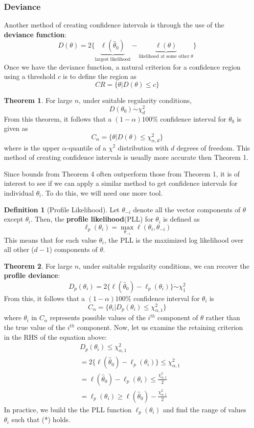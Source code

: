\documentclass{article}
\theoremstyle{definition}
\newtheorem{theorem}{Theorem}
\theoremstyle{definition}
\newtheorem{definition}{Definition}
\def\l{\ell}
\newcommand{\dotrel}[1]{\mathrel{\dot{#1}}}
\begin{document}
\subsubsection{Deviance}
Another method of creating confidence intervals is through the use of the \textbf{deviance function}:
\[D(\theta)= 2\{ \underbrace{\l(\hat{\theta}_0)}_{\text{largest likelihood}} - \underbrace{\l(\theta)}_{\text{likelihood at some other $\theta$}}\}\]
Once we have the deviance function, a natural criterion for a confidence region using a threshold $c$ is to define the region as
\[CR=\{\theta| D(\theta)\leq c\}\]

\begin{theorem}For large $n$, under suitable regularity conditions, 
\[D(\theta_0)\dotrel{\sim} \chi^2_d\]
From this theorem, it follows that a $(1-\alpha)100\%$ confidence interval for $\theta_0$ is given as 
\[C_\alpha= \{\theta| D(\theta)\leq \chi_{\alpha,d}^2\}\]
where is the upper $\alpha$-quantile of a $\chi^2$ distribution with $d$ degrees of freedom. This method of creating confidence intervals is usually more accurate then Theorem 1.
\end{theorem}
Since bounds from Theorem 4 often outperform those from Theorem 1, it is of interest to see if we can apply a similar method to get confidence intervals for individual $\theta_i$. To do this, we will need one more tool.
\begin{definition}[Profile Likelihood]
Let $\theta_{-i}$ denote all the vector components of $\theta$ except $\theta_i$. Then, the \textbf{profile likelihood}(PLL) for $\theta_i$ is defined as 
\[\l_p(\theta_i)= \max_{\theta_{-i}}\l(\theta_i, \theta_{-i})\]
This means that for each value $\theta_i$, the PLL is the maximized log likelihood over all other ($d-1$) components of $\theta$.
\end{definition}

\begin{theorem}For large $n$, under suitable regularity conditions, we can recover the \textbf{profile deviance}:
\[D_p(\theta_i)= 2 \{ \l(\hat{\theta}_0) - \l_p(\theta_i)\}\dotrel{\sim} \chi^2_1\]
From this, it follows that a $(1-\alpha)100\%$ confidence interval for $\theta_i$ is
\[C_\alpha = \{\theta_i | D_p(\theta_i)\leq \chi^2_{\alpha,1}\}\]
where $\theta_i$ in $C_\alpha$ represents possible values of the $i^{th}$ component of $\theta$ rather than the true value of the $i^{th}$ component.
Now, let us examine the retaining criterion in the RHS of the equation above:
\begin{align*}
    &D_p(\theta_i)\leq \chi_{\alpha,1}^2\\
    &=2 \{ \l(\hat{\theta}_0) - \l_p(\theta_i)\} \leq \chi_{\alpha,1}^2\\
    &= \l(\hat{\theta}_0) - \l_p(\theta_i) \leq \frac{\chi_{\alpha,1}^2}{2}\\
    &= \l_p(\theta_i) \geq \l(\hat{\theta}_0) -\frac{\chi_{\alpha,1}^2}{2} \tag{*}
\end{align*}
In practice, we build the the PLL function $\l_p(\theta_i)$ and find the range of values $\theta_i$ such that (*) holds.
\end{theorem}
\end{document}
